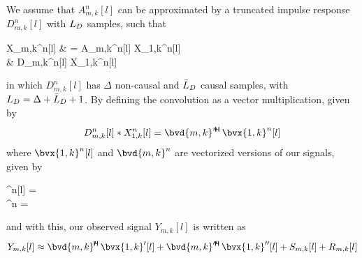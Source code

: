 %	
We assume that $A_{m,k}^n[l]$ can be approximated by a truncated impulse response $D_{m,k}^n[l]$ with $\Ld$ samples, such that
\begin{equations}
	X_{m,k}^n[l]
	& = A_{m,k}^n[l] \ast X_{1,k}^n[l] \\
	& \approx D_{m,k}^n[l] \ast X_{1,k}^n[l]
\end{equations}
in which $D_{m,k}^n[l]$ has $\Delta$ non-causal and $\Ld*$ causal samples, with $\Ld = \Delta + \Ld* + 1$. By defining the convolution as a vector multiplication, given by
\begin{equation}
	D_{m,k}^n[l] \ast X_{1,k}^n[l] = \he*{\bvd{m,k}^n} \bvx{1,k}^n[l]
\end{equation}
where $\bvx{1,k}^n[l]$ and $\bvd{m,k}^n$ are vectorized versions of our signals, given by
\begin{subgather}
	^n[l] =  \\
	^n =  
\end{subgather}
and with this, our observed signal $Y_{m,k}[l]$ is written as
\begin{equation}
	Y_{m,k}[l] \approx \he*{\bvd{m,k}'} \bvx{1,k}'[l] + \he*{\bvd{m,k}''} \bvx{1,k}''[l] + S_{m,k}[l] + R_{m,k}[l]
\end{equation}

